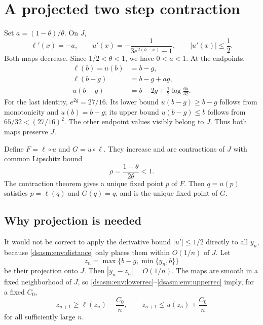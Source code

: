 \documentclass[11pt,letterpaper]{article}
\theoremstyle{remark}\newtheorem{remark}[theorem]{Remark}
\begin{document}
\section{A projected two step contraction}
\label{dsasm:env:sec:trapping}
Set $a=(1-\theta)/\theta$. On $J$,
\begin{equation}\label{dsasm:env:derivatives}
 \ell'(x)=-a,\qquad
 u'(x)=-\frac1{3e^{2(b-x)}-1},\qquad |u'(x)|\le\frac12.
\end{equation}
Both maps decrease. Since $1/2<\theta<1$, we have $0<a<1$.
At the endpoints,
\begin{equation}\label{dsasm:env:endpoints}
\begin{split}
 \ell(b)=u(b)&=b-g,\\
 \ell(b-g)&=b-g+ag,\\
 u(b-g)&=b-2g+\frac12\log\frac{65}{32}.
\end{split}
\end{equation}
For the last identity, $e^{2g}=27/16$. Its lower bound $u(b-g)\ge b-g$
follows from monotonicity and $u(b)=b-g$; its upper bound
$u(b-g)\le b$ follows from $65/32<(27/16)^2$.
The other endpoint values visibly belong to $J$. Thus both maps
preserve $J$.

Define $F=\ell\circ u$ and $G=u\circ\ell$. They increase and are
contractions of $J$ with common Lipschitz bound
\begin{equation}\label{dsasm:env:rho}
 \rho=\frac{1-\theta}{2\theta}<1.
\end{equation}
The contraction theorem gives a unique fixed point $p$ of $F$.
Then $q=u(p)$ satisfies $p=\ell(q)$ and $G(q)=q$, and is the unique
fixed point of $G$.

\subsection{Why projection is needed}
It would not be correct to apply the derivative bound
$|u'|\le1/2$ directly to all $y_n$, because \eqref{dsasm:env:distance} only
places them within $O(1/n)$ of $J$. Let
\[
 z_n=\max\{b-g,\min\{y_n,b\}\}
\]
be their projection onto $J$. Then $|y_n-z_n|=O(1/n)$. The maps are
smooth in a fixed neighborhood of $J$, so
\eqref{dsasm:env:lowerrec}--\eqref{dsasm:env:upperrec} imply, for a fixed $C_0$,
\begin{equation}\label{dsasm:env:projected}
 z_{n+1}\ge\ell(z_n)-\frac{C_0}{n},\qquad
 z_{n+1}\le u(z_n)+\frac{C_0}{n}
\end{equation}
for all sufficiently large $n$.
\end{document}
